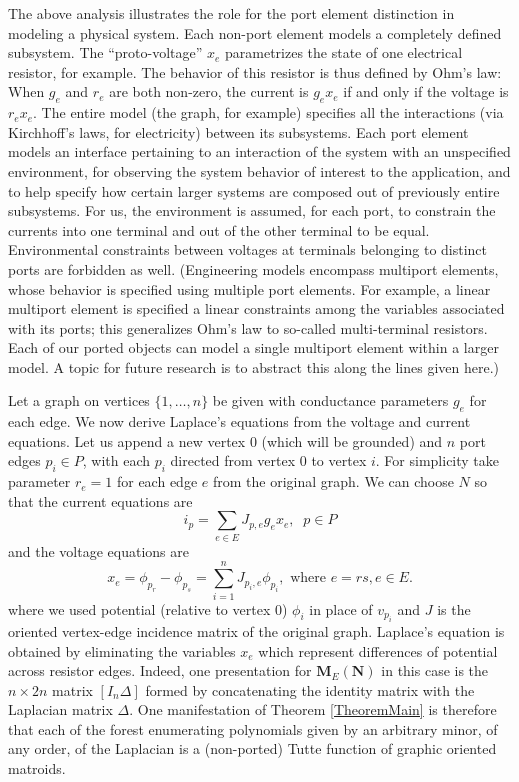 \documentclass[12pt]{article}
\theoremstyle{definition}
\newcommand{\ext}[1]{\ensuremath{\mathbf{#1}}}
\begin{document}
The above analysis illustrates the role for the port element
distinction in modeling a physical system.
Each non-port 
element models a completely defined subsystem.
The ``proto-voltage\cite{SmithElec}'' $x_e$ parametrizes the
state of one electrical resistor, for example.
The behavior of this resistor is thus defined by 
Ohm's law:  
When $g_e$ and $r_e$ are both non-zero, the current is $g_ex_e$ if and only if the voltage is $r_ex_e$.
The entire model (the graph, for example) specifies all the interactions 
(via Kirchhoff's laws, for electricity) between
its subsystems.
Each port element models an 
interface pertaining to an interaction 
of the system with an unspecified environment, for observing the system
behavior of interest to the application, and to help specify how 
certain larger systems are composed out of 
previously entire 
subsystems.  
For us, the environment
is assumed, for each port,
to constrain the currents into one terminal and out of the other
terminal to be equal. Environmental constraints between
voltages at terminals belonging to distinct ports are forbidden as well.
(Engineering models encompass multiport elements, whose
behavior is specified using multiple port elements\cite{ChensBook,Recski,LinNonLinCircuitsBook}.
For example, a linear multiport element is specified a linear
constraints among the variables associated with its ports; this generalizes
Ohm's law to so-called multi-terminal resistors.  
Each of our
ported objects 
can model a single multiport element
within a larger model.
A topic for 
future research is to abstract this along the lines given here.)

Let a graph on vertices $\{1,\ldots, n\}$ be given with conductance parameters 
$g_e$ for each edge.  
We now derive Laplace's equations from the voltage and current equations.
Let us
append a new vertex $0$ (which will be grounded) and 
$n$ port edges $p_i\in P$, with
each $p_i$ directed from vertex $0$ to vertex $i$.  For simplicity take
parameter $r_e=1$ for each edge $e$ from the original graph.  We can choose
$N$ so that the current equations are 
\[
i_p = \sum_{e\in E}J_{p,e}g_ex_e,\;\;p\in P
\]
and the voltage equations are
\[
x_e = \phi_{p_r} - \phi_{p_s} = \sum_{i=1}^n J_{p_i,e} \phi_{p_i},
\text{ where }e=rs, e\in E.
\]
where we used potential (relative to vertex $0$) $\phi_i$ in place of 
$v_{p_i}$ and $J$ is the oriented vertex-edge incidence matrix of the original
graph.  Laplace's equation is obtained by eliminating 
the variables $x_e$ which represent differences of potential across
resistor edges.  Indeed, one presentation for 
$\ext{M}_E(\ext{N})$ in this case is the $n\times 2n$ matrix
$[I_n \Delta]$ formed by concatenating the identity matrix with
the Laplacian matrix $\Delta$.  One manifestation of Theorem 
\ref{TheoremMain} is therefore that each of the forest enumerating
polynomials given by an arbitrary minor, of any order, of the Laplacian
is a (non-ported) Tutte function of graphic oriented matroids.
\end{document}
